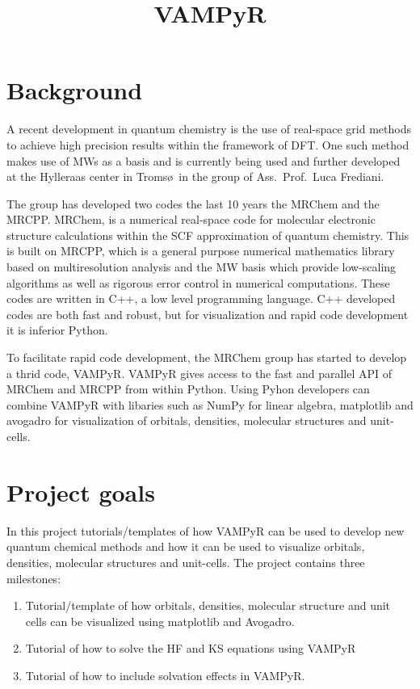 \documentclass[12pt]{article}
\begin{document}
\title{VAMPyR}

\maketitle

\section{Background}

A recent development in quantum chemistry is the use of real-space grid
methods to achieve high precision results within the framework of
\ac{DFT}. One such method makes use of \acp{MW} as a
basis\cite{harrison2003multiresolution}
and is currently being used and further developed at the Hylleraas
center in Troms\o \, in the group of Ass.~Prof.~Luca Frediani.

The group has developed two codes the last 10 years the \ac{MRChem}\cite{mrchem} and
the \ac{MRCPP}\cite{mrcpp}.
\ac{MRChem}, is
a numerical real-space code for molecular electronic structure calculations
within the \ac{SCF} approximation of quantum chemistry. This is built on
\ac{MRCPP}, which is a general purpose numerical mathematics library
based on multiresolution analysis and the \ac{MW} basis which provide
low-scaling algorithms as well as rigorous error control in numerical
computations. These codes are written in C++, a low level programming language.
C++ developed codes are both fast and robust, but for visualization and
rapid code development it is inferior Python.

To facilitate rapid code development,
the \ac{MRChem} group has started to develop a thrid code,
\ac{VAMPyR}\cite{vampyr}. \ac{VAMPyR} gives access to the
fast and parallel \ac{API}
of \ac{MRChem} and \ac{MRCPP} from within Python. Using Pyhon developers can
combine \ac{VAMPyR} with libaries such as NumPy for linear algebra, matplotlib
and avogadro for visualization of orbitals, densities, molecular structures
and unit-cells.

\section{Project goals}

In this project tutorials/templates of how \ac{VAMPyR} can be used to
develop new quantum chemical methods and how it can be used to visualize
orbitals, densities, molecular structures and unit-cells.
The project contains three milestones:

\begin{enumerate}
    \item Tutorial/template of how orbitals, densities, molecular structure and unit cells
    can be visualized using matplotlib and Avogadro.
    \item Tutorial of how to solve the \ac{HF} and \ac{KS} equations using \ac{VAMPyR}
    \item Tutorial of how to include solvation effects in \ac{VAMPyR}.
\end{enumerate}
\end{document}
